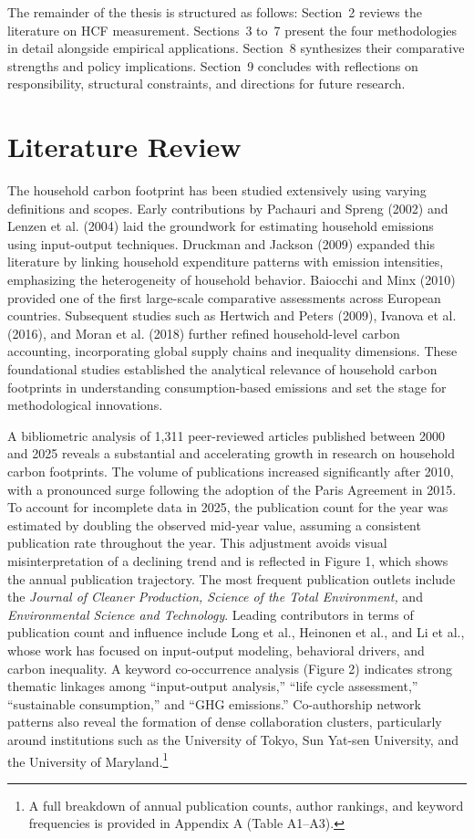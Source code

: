 \documentclass[12pt,a4paper]{article}%
\begin{document}
The remainder of the thesis is structured as follows: Section~2 reviews the literature on HCF measurement. Sections~3 to~7 present the four methodologies in detail alongside empirical applications. Section~8 synthesizes their comparative strengths and policy implications. Section~9 concludes with reflections on responsibility, structural constraints, and directions for future research.

\section{Literature Review}
The household carbon footprint has been studied extensively using varying definitions and scopes. Early contributions by Pachauri and Spreng (2002) and Lenzen et al. (2004) laid the groundwork for estimating household emissions using input-output techniques. Druckman and Jackson (2009) expanded this literature by linking household expenditure patterns with emission intensities, emphasizing the heterogeneity of household behavior. Baiocchi and Minx (2010) provided one of the first large-scale comparative assessments across European countries. Subsequent studies such as Hertwich and Peters (2009), Ivanova et al. (2016), and Moran et al. (2018) further refined household-level carbon accounting, incorporating global supply chains and inequality dimensions. These foundational studies established the analytical relevance of household carbon footprints in understanding consumption-based emissions and set the stage for methodological innovations.

A bibliometric analysis of 1,311 peer-reviewed articles published between 2000 and 2025 reveals a substantial and accelerating growth in research on household carbon footprints. The volume of publications increased significantly after 2010, with a pronounced surge following the adoption of the Paris Agreement in 2015. To account for incomplete data in 2025, the publication count for the year was estimated by doubling the observed mid-year value, assuming a consistent publication rate throughout the year. This adjustment avoids visual misinterpretation of a declining trend and is reflected in Figure 1, which shows the annual publication trajectory. The most frequent publication outlets include the \textit{Journal of Cleaner Production, Science of the Total Environment,} and \textit{Environmental Science and Technology}. Leading contributors in terms of publication count and influence include Long et al., Heinonen et al., and Li et al., whose work has focused on input-output modeling, behavioral drivers, and carbon inequality. A keyword co-occurrence analysis (Figure 2) indicates strong thematic linkages among “input-output analysis,” “life cycle assessment,” “sustainable consumption,” and “GHG emissions.” Co-authorship network patterns also reveal the formation of dense collaboration clusters, particularly around institutions such as the University of Tokyo, Sun Yat-sen University, and the University of Maryland.\footnote{A full breakdown of annual publication counts, author rankings, and keyword frequencies is provided in Appendix A (Table A1–A3).}
\end{document}
